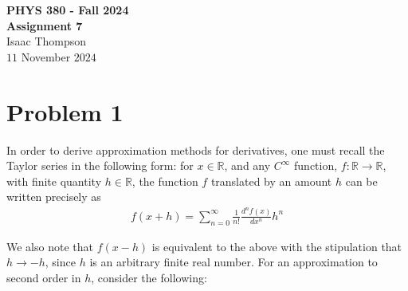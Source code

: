 \documentclass[letter,12pt]{article}
\begin{document}
\begin{center}
{\Large \bf PHYS 380 - Fall 2024}\\
\vspace{10pt}
{\bf Assignment 7}\\
\vspace{10pt}
{Isaac Thompson}\\
\vspace{10pt}
{$11$ November $2024$}
\end{center}
\vspace{0.1in}

\section{Problem 1}
\vspace{0.15in}

\indent In order to derive approximation methods for derivatives, one must recall the Taylor series in the following form: for $x\in\mathbb{R}$, and any $C^{\infty}$ function, $f:\mathbb{R} \to \mathbb{R}$, with finite quantity $h \in \mathbb{R}$, the function $f$ translated by an amount $h$ can be written precisely as
\begin{align}
f(x+h) = \sum_{n=0}^{\infty} \frac{1}{n!} \frac{d^n f(x)}{dx^n} h^n
\end{align}

\noindent We also note that $f(x-h)$ is equivalent to the above with the stipulation that $h \to -h$, since $h$ is an arbitrary finite real number. For an approximation to second order in $h$, consider the following:
\end{document}
